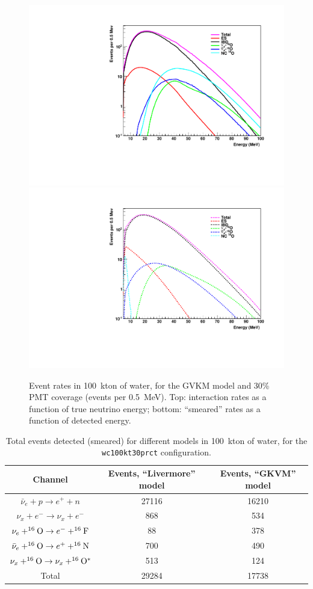 \documentclass[12pt]{article}
\begin{document}
\begin{figure}[htb]
  \centering\includegraphics[width=.75\textwidth]{interaction_rates_gvkm_wc100kt30prct.pdf}
  \centering\includegraphics[width=.75\textwidth]{smeared_rates_gvkm_wc100kt30prct.pdf}

  \caption{Event rates in 100~kton of water, for the GVKM model and 30\% PMT
    coverage (events per 0.5~MeV). Top: interaction rates as a
    function of true neutrino energy; bottom:  ``smeared''
    rates as a function of detected energy.}
  \label{fig:wcrates}
\end{figure}

\begin{table}[h]
\centering
\begin{tabular}{|c|c|c|}
\hline
Channel & Events, ``Livermore'' model & Events, ``GKVM'' model  \\
\hline
   $\bar{\nu}_e+ p \rightarrow e^+ + n$                  &  27116 &   16210\\
$\nu_x + e^- \rightarrow \nu_x + e^-$                           & 868 &   534\\
$\nu_e + ^{16}{\rm O} \rightarrow e^- + ^{16}{\rm F}$                         & 88  &  378  \\
$\bar{\nu}_e + ^{16}{\rm O} \rightarrow e^+ + ^{16}{\rm N}$  & 700 &  490 \\


$\nu_x + ^{16}{\rm O} \rightarrow \nu_x+ ^{16}{\rm O}^*$
                         &  513 &  124 \\ \hline
Total &  29284 & 17738 \\ \hline
\end{tabular}
\caption{Total events detected (smeared) for different models in 100~kton of water, for the
\texttt{wc100kt30prct} configuration. }
\label{tab:wctable}
\end{table}
\end{document}
